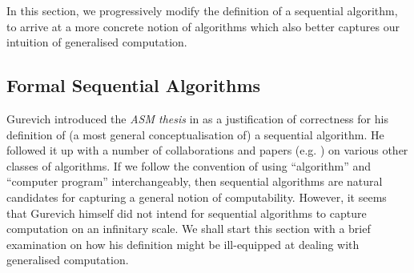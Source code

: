\documentclass[12pt, twoside]{memoir}
\numberwithin{equation}{section}
\theoremstyle{definition}
\theoremstyle{remark}
\theoremstyle{definition}
\theoremstyle{definition}
\theoremstyle{definition}
\theoremstyle{remark}
\begin{document}
In this section, we progressively modify the definition of a sequential algorithm, to arrive at a more concrete notion of algorithms which also better captures our intuition of generalised computation. 

\subsection{Formal Sequential Algorithms}\label{ss210}

Gurevich introduced the \textit{ASM thesis} in \cite{gurevich} as a justification of correctness for his definition of (a most general conceptualisation of) a sequential algorithm. He followed it up with a number of collaborations and papers (e.g. \cite{gurevichblass}) on various other classes of algorithms. If we follow the convention of using ``algorithm'' and ``computer program'' interchangeably, then sequential algorithms are natural candidates for capturing a general notion of computability. However, it seems that Gurevich himself did not intend for sequential algorithms to capture computation on an infinitary scale. We shall start this section with a brief examination on how his definition might be ill-equipped at dealing with generalised computation. 
\end{document}
